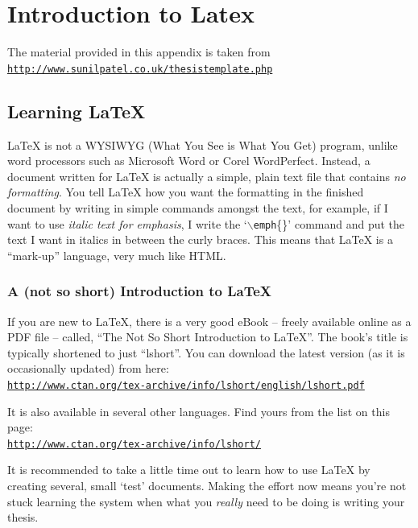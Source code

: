 
\chapter{Introduction to Latex}
\label{AppendixA}




The material provided in this appendix is taken from \\
\href{http://www.sunilpatel.co.uk/thesistemplate.php}{\texttt{http://www.sunilpatel.co.uk/thesistemplate.php}}

\section{Learning \LaTeX{}}

\LaTeX{} is not a WYSIWYG (What You See is What You Get) program, unlike word processors such as Microsoft Word or Corel WordPerfect. Instead, a document written for \LaTeX{} is actually a simple, plain text file that contains \emph{no formatting}. You tell \LaTeX{} how you want the formatting in the finished document by writing in simple commands amongst the text, for example, if I want to use \emph{italic text for emphasis}, I write the `$\backslash$\texttt{emph}\{\}' command and put the text I want in italics in between the curly braces. This means that \LaTeX{} is a ``mark-up'' language, very much like HTML.

\subsection{A (not so short) Introduction to \LaTeX{}}

If you are new to \LaTeX{}, there is a very good eBook -- freely available online as a PDF file -- called, ``The Not So Short Introduction to \LaTeX{}''. The book's title is typically shortened to just ``lshort''. You can download the latest version (as it is occasionally updated) from here:\\
\href{http://www.ctan.org/tex-archive/info/lshort/english/lshort.pdf}{\texttt{http://www.ctan.org/tex-archive/info/lshort/english/lshort.pdf}}

It is also available in several other languages. Find yours from the list on this page:\\
\href{http://www.ctan.org/tex-archive/info/lshort/}{\texttt{http://www.ctan.org/tex-archive/info/lshort/}}

It is recommended to take a little time out to learn how to use \LaTeX{} by creating several, small `test' documents. Making the effort now means you're not stuck learning the system when what you \emph{really} need to be doing is writing your thesis.


